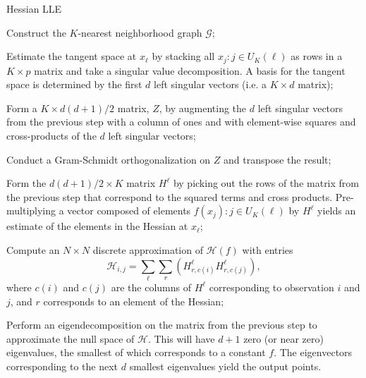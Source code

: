 \documentclass[11pt,a4paper,]{article}
\begin{document}
\begin{algorithm}[!htb]
  \caption{Hessian LLE}
  \label{alg:hlle}
  \DontPrintSemicolon
  \SetAlgoLined
  \BlankLine
  \begin{algorithmic}[1]

  \STATE Construct the $K$-nearest neighborhood graph $\mathcal{G}$;


  \STATE Estimate the tangent space at $x_\ell$ by stacking all $x_j:j\in U_K(\ell)$ as rows in a $K\times p$ matrix and take a singular value decomposition. A basis for the tangent space is determined by the first $d$ left singular vectors (i.e. a $K\times d$ matrix);

  \STATE Form a $K\times d(d+1)/2$ matrix, $Z$, by augmenting the $d$ left singular vectors from the previous step with a column of ones and with element-wise squares and cross-products of the $d$ left singular vectors;

  \STATE Conduct a Gram-Schmidt orthogonalization on $Z$ and transpose the result;

  \STATE Form the $d(d+1)/2\times K$ matrix $H^\ell$ by picking out the rows of the matrix from the previous step that correspond to the squared terms and cross products. Pre-multiplying a vector composed of elements $f(x_j):j\in U_K(\ell)$ by $H^\ell$ yields an estimate of the elements in the Hessian at $x_\ell$;

  \ENDFOR

  \STATE Compute an $N\times N$ discrete approximation of $\mathcal{H}(f)$ with entries
  $$
    \mathcal{H}_{i,j} = \sum_\ell \sum_r (H^\ell_{r,c(i)} H^\ell_{r,c(j)}),
  $$
  where $c(i)$ and $c(j)$ are the columns of $H^\ell$ corresponding to observation $i$ and $j$, and $r$ corresponds to an element of the Hessian;

  \STATE  Perform an eigendecomposition on the matrix from the previous step to approximate the null space of $\mathcal{H}$. This will have $d+1$ zero (or near zero) eigenvalues, the smallest of which corresponds to a constant $f$. The eigenvectors corresponding to the next $d$ smallest eigenvalues yield the output points.

  \end{algorithmic}
\end{algorithm}
\end{document}
